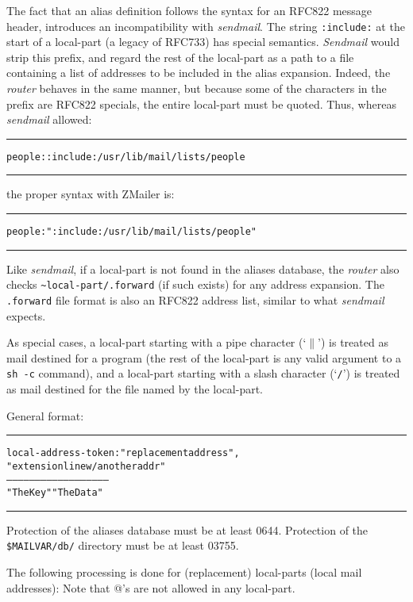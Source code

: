 The fact that an alias definition follows the syntax for an RFC822 message
header, introduces an incompatibility with {\em sendmail}.  The string
{\tt :include:} at the start of a local-part (a legacy of RFC733) has special
semantics. {\em Sendmail} would strip this prefix, and regard the rest of the
local-part as a path to a file containing a list of addresses to be
included in the alias expansion. Indeed, the {\em router} behaves in the same
manner, but because some of the characters in the prefix are RFC822
specials, the entire local-part must be quoted.  Thus, whereas {\em sendmail}
allowed:

\begin{alltt}\medskip\small\hrule\medskip
people: :include:/usr/lib/mail/lists/people
\medskip\hrule\end{alltt}\medskip

the proper syntax with ZMailer is:
\begin{alltt}\medskip\small\hrule\medskip
people: ":include:/usr/lib/mail/lists/people"
\medskip\hrule\end{alltt}\medskip


Like {\em sendmail}, if a local-part is not found in the aliases database, the
{\em router} also checks {\tt \~{}local-part/.forward} (if such exists) for 
any address expansion.  The {\tt .forward} file format is also an RFC822 
address list, similar to what {\em sendmail} expects.

As special cases, a local-part starting with a pipe character (`{\tt $\|$}') is
treated as mail destined for a program (the rest of the local-part is any
valid argument to a {\tt sh -c} command), and a local-part starting with a
slash character (`{\tt /}') is treated as mail destined for the file named 
by the local-part.

General format:

\begin{alltt}\medskip\hrule\scriptsize\medskip
 local-address-token:    "replacement address" ,
                         "extension line w/ another addr"
 --------------------    --------------------------------
     "The Key"                "The Data"
\medskip\hrule\end{alltt}\medskip

Protection of the aliases database must be at least 0644.
Protection of the {\tt \$MAILVAR/db/} directory must be at least 03755.



The following processing is done for (replacement) local-parts
(local mail addresses):  Note that @'s are not allowed in any local-part.



